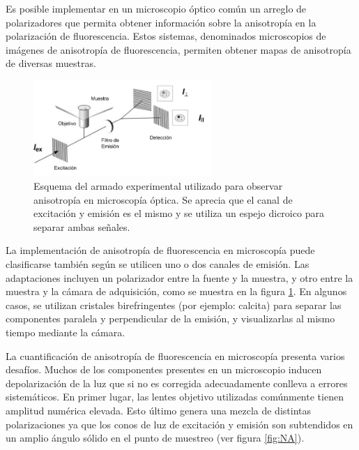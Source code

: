 Es posible implementar en un microscopio óptico común un arreglo de polarizadores que permita obtener información sobre la anisotropía en la polarización de fluorescencia. Estos sistemas, denominados microscopios de imágenes de anisotropía de fluorescencia, permiten obtener mapas de anisotropía de diversas muestras.

\begin{figure}
    \centering
    \includegraphics[width=0.6\textwidth]{./img/EsquemaAnisotropia.png}
    \caption{Esquema del armado experimental utilizado para observar anisotropía en microscopía óptica. Se aprecia que el canal de excitación y emisión es el mismo y se utiliza un espejo dicroico para separar ambas señales\cite{Chan2011}.}
    \label{fig:EsquemaMicro}
\end{figure}

La implementación de anisotropía de fluorescencia en microscopía puede clasificarse también según se utilicen uno o dos canales de emisión. Las adaptaciones incluyen un polarizador entre la fuente y la muestra, y otro entre la muestra y la cámara de adquisición, como se muestra en la figura \ref{fig:EsquemaMicro}. En algunos casos, se utilizan cristales birefringentes (por ejemplo: calcita) para separar las componentes paralela y perpendicular de la emisión, y visualizarlas al mismo tiempo mediante la cámara\cite{Yao2010}.

La cuantificación de anisotropía de fluorescencia en microscopía presenta varios desafíos. Muchos de los componentes presentes en un microscopio inducen depolarización de la luz que si no es corregida adecuadamente conlleva a errores sistemáticos\cite{Chan2011}. En primer lugar, las lentes objetivo utilizadas comúnmente tienen amplitud numérica elevada. Esto último genera una mezcla de distintas polarizaciones ya que los conos de luz de excitación y emisión son subtendidos en un amplio ángulo sólido en el punto de muestreo (ver figura \ref{fig:NA})\cite{Andreev1993}.

